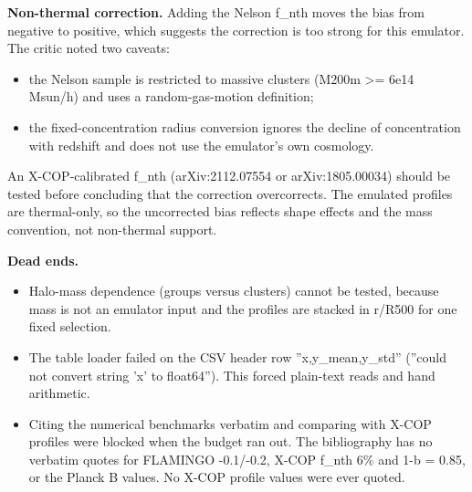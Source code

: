\documentclass[11pt,a4paper]{article}
\begin{document}
\textbf{Non-thermal correction.} Adding the Nelson f\_nth moves the bias from negative to positive, which suggests the correction is too strong for this emulator. The critic noted two caveats:

\begin{itemize}
  \item the Nelson sample is restricted to massive clusters (M200m \textgreater{}= 6e14 Msun/h) and uses a random-gas-motion definition;
  \item the fixed-concentration radius conversion ignores the decline of concentration with redshift and does not use the emulator's own cosmology.
\end{itemize}
An X-COP-calibrated f\_nth (arXiv:2112.07554 or arXiv:1805.00034) should be tested before concluding that the correction overcorrects. The emulated profiles are thermal-only, so the uncorrected bias reflects shape effects and the mass convention, not non-thermal support.

\textbf{Dead ends.}

\begin{itemize}
  \item Halo-mass dependence (groups versus clusters) cannot be tested, because mass is not an emulator input and the profiles are stacked in r/R500 for one fixed selection.
  \item The table loader failed on the CSV header row ''x,y\_mean,y\_std'' (''could not convert string 'x' to float64''). This forced plain-text reads and hand arithmetic.
  \item Citing the numerical benchmarks verbatim and comparing with X-COP profiles were blocked when the budget ran out. The bibliography has no verbatim quotes for FLAMINGO -0.1/-0.2, X-COP f\_nth 6\% and 1-b = 0.85, or the Planck B values. No X-COP profile values were ever quoted.
\end{itemize}
\end{document}
